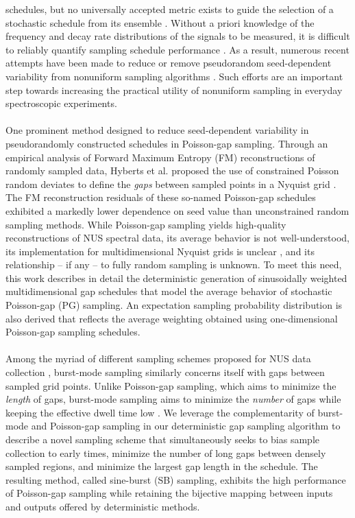 \begin{doublespace}
schedules, but no universally accepted metric exists to guide the selection
of a stochastic schedule from its ensemble \cite{mobli:jmr2015,aoto:jmr2014}.
Without a priori knowledge of the frequency and decay rate distributions of
the signals to be measured, it is difficult to reliably quantify sampling
schedule performance \cite{mobli:pnmrs2014,schuyler:jbnmr2011}. As a result,
numerous recent attempts have been made to reduce or remove pseudorandom
seed-dependent variability from nonuniform sampling algorithms
\cite{kazimierczuk:jmr2007,hyberts:jacs2010,eddy:jmr2012,mobli:jmr2015}.
Such efforts are an important step towards increasing the practical utility
of nonuniform sampling in everyday spectroscopic experiments.
\\\\
One prominent method designed to reduce seed-dependent variability in
pseudorandomly constructed schedules in Poisson-gap sampling. Through an
empirical analysis of Forward Maximum Entropy (FM) reconstructions
of randomly sampled data, Hyberts et al. proposed the use of constrained
Poisson random deviates to define the \emph{gaps} between sampled points
in a Nyquist grid \cite{hyberts:jacs2010}. The FM reconstruction residuals
of these so-named Poisson-gap schedules exhibited a markedly lower dependence
on seed value than unconstrained random sampling methods. While Poisson-gap
sampling yields high-quality reconstructions of NUS spectral data, its average
behavior is not well-understood, its implementation for multidimensional
Nyquist grids is unclear
\cite{hyberts:tcc2012,hyberts:jbnmr2012,hyberts:jmr2014},
and its relationship -- if any -- to fully random sampling is unknown.
To meet this need, this work describes in detail the deterministic generation
of sinusoidally weighted multidimensional gap schedules that model the average
behavior of stochastic Poisson-gap (PG) sampling. An expectation sampling
probability distribution is also derived that reflects the average weighting
obtained using one-dimensional Poisson-gap sampling schedules.
\\\\
Among the myriad of different sampling schemes proposed for NUS data
collection \cite{maciejewski:tcc2012}, burst-mode sampling similarly concerns
itself with gaps between sampled grid points. Unlike Poisson-gap sampling,
which aims to minimize the \emph{length} of gaps, burst-mode sampling aims
to minimize the \emph{number} of gaps while keeping the effective dwell time
low \cite{maciejewski:jmr2009}. We leverage the complementarity of burst-mode
and Poisson-gap sampling in our deterministic gap sampling algorithm to
describe a novel sampling scheme that simultaneously seeks to bias sample
collection to early times, minimize the number of long gaps between densely
sampled regions, and minimize the largest gap length in the schedule. The
resulting method, called sine-burst (SB) sampling, exhibits the high
performance of Poisson-gap sampling while retaining the bijective mapping
between inputs and outputs offered by deterministic methods.
\end{doublespace}

